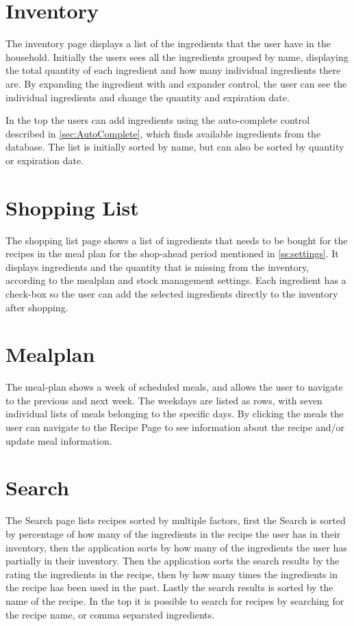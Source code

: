 \section{Inventory} \label{ss:inventory}
The inventory page displays a list of the ingredients that the user have in the household. Initially the users sees all the ingredients grouped by name, displaying the total quantity of each ingredient and how many individual ingredients there are. By expanding the ingredient with and expander control, the user can see the individual ingredients and change the quantity and expiration date.

In the top the users can add ingredients using the auto-complete control described in \cref{sec:AutoComplete}, which finds available ingredients from the database. The list is initially sorted by name, but can also be sorted by quantity or expiration date.

\section{Shopping List}
The shopping list page shows a list of ingredients that needs to be bought for the recipes in the meal plan for the shop-ahead period mentioned in \cref{ss:settings}. It displays ingredients and the quantity that is missing from the inventory, according to the mealplan and stock management settings. Each ingredient has a check-box so the user can add the selected ingredients directly to the inventory after shopping.

\section{Mealplan}
The meal-plan shows a week of scheduled meals, and allows the user to navigate to the previous and next week. The weekdays are listed as rows, with seven individual lists of meals belonging to the specific days. By clicking the meals the  user can navigate to the Recipe Page to see information about the recipe and/or update meal information.

\section{Search}
The Search page lists recipes sorted by multiple factors, first the Search is sorted by percentage of how many of the ingredients in the recipe the user has in their inventory, then the application sorts by how many of the ingredients the user has partially in their inventory. Then the application sorts the search results by the rating the ingredients in the recipe, then by how many times the ingredients in the recipe has been used in the past. Lastly the search results is sorted by the name of the recipe.
In the top it is possible to search for recipes by searching for the recipe name, or comma separated ingredients.

